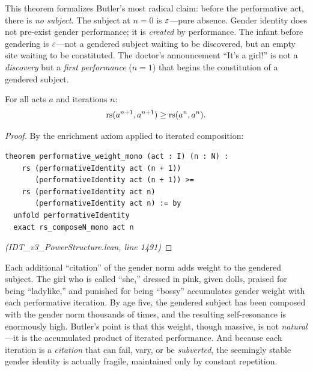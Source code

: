\begin{interpretation}
This theorem formalizes Butler's most radical claim: before the performative
act, there is \emph{no subject}. The subject at $n = 0$ is $\varepsilon$---pure
absence. Gender identity does not pre-exist gender performance; it is
\emph{created} by performance. The infant before gendering is $\varepsilon$---not
a gendered subject waiting to be discovered, but an empty site waiting to be
constituted. The doctor's announcement ``It's a girl!'' is not a
\emph{discovery} but a \emph{first performance} ($n = 1$) that begins the
constitution of a gendered subject.
\end{interpretation}

\begin{theorem}
\label{thm:performative-mono}
For all acts $a$ and iterations $n$:
\[
  \mathrm{rs}(a^{n+1}, a^{n+1}) \geq \mathrm{rs}(a^n, a^n).
\]
\end{theorem}

\begin{proof}
By the enrichment axiom applied to iterated composition:
\begin{lstlisting}
theorem performative_weight_mono (act : I) (n : N) :
    rs (performativeIdentity act (n + 1))
       (performativeIdentity act (n + 1)) >=
    rs (performativeIdentity act n)
       (performativeIdentity act n) := by
  unfold performativeIdentity
  exact rs_composeN_mono act n
\end{lstlisting}
\textit{(IDT\_v3\_PowerStructure.lean, line 1491)}
\end{proof}

\begin{interpretation}
Each additional ``citation'' of the gender norm adds weight to the gendered
subject. The girl who is called ``she,'' dressed in pink, given dolls, praised
for being ``ladylike,'' and punished for being ``bossy'' accumulates gender
weight with each performative iteration. By age five, the gendered subject has
been composed with the gender norm thousands of times, and the resulting
self-resonance is enormously high. Butler's point is that this weight, though
massive, is not \emph{natural}---it is the accumulated product of iterated
performance. And because each iteration is a \emph{citation} that can fail,
vary, or be \emph{subverted}, the seemingly stable gender identity is actually
fragile, maintained only by constant repetition.
\end{interpretation}

